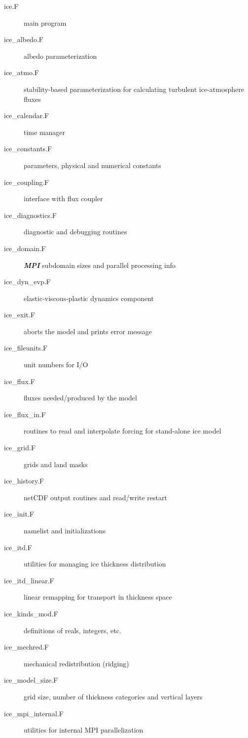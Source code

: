 \begin{description}
  \item [ice.F]                     main program 
  \item [ice\_albedo.F]             albedo parameterization
  \item [ice\_atmo.F]               stability-based parameterization for calculating
                                        turbulent ice-atmosphere fluxes
  \item [ice\_calendar.F]           time manager
  \item [ice\_constants.F]          parameters, physical and numerical constants
  \item [ice\_coupling.F]           interface with flux coupler
  \item [ice\_diagnostics.F]        diagnostic and debugging routines
  \item [ice\_domain.F]             {\bf \textsl{MPI}} subdomain sizes and parallel processing info
  \item [ice\_dyn\_evp.F]           elastic-viscous-plastic dynamics component
  \item [ice\_exit.F]               aborts the model and prints error message
  \item [ice\_fileunits.F]          unit numbers for I/O
  \item [ice\_flux.F]               fluxes needed/produced by the model
  \item [ice\_flux\_in.F]           routines to read and interpolate forcing for stand-alone ice model
  \item [ice\_grid.F]               grids and land masks
  \item [ice\_history.F]            netCDF output routines and read/write restart
  \item [ice\_init.F]               namelist and initializations
  \item [ice\_itd.F]                utilities for managing ice thickness distribution
  \item [ice\_itd\_linear.F]        linear remapping for transport in thickness space
  \item [ice\_kinds\_mod.F]         definitions of reals, integers, etc.
  \item [ice\_mechred.F]            mechanical redistribution (ridging)
  \item [ice\_model\_size.F]        grid size, number of thickness categories and vertical layers
  \item [ice\_mpi\_internal.F]      utilities for internal MPI parallelization

\end{description}
